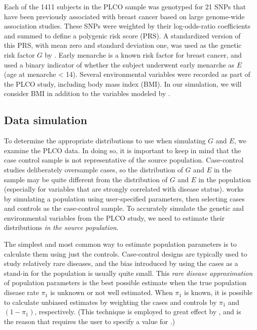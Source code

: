 \documentclass[nojss]{jss}
\begin{document}
Each of the 1411 subjects in the PLCO sample was genotyped for 21 SNPs
that have been previously associated with breast cancer based on large
genome-wide association studies. These SNPs were weighted by their
log-odds-ratio coefficients and summed to define a polygenic risk score
(PRS). A standardized version of this PRS, with mean zero and standard
deviation one, was used as the genetic risk factor \(G\) by
\citeauthor{Wang2018unpublished}. Early menarche is a known risk factor
for breast cancer, and \citeauthor{Wang2018unpublished} used a binary
indicator of whether the subject underwent early menarche as \(E\) (age
at menarche \textless{} 14). Several environmental variables were
recorded as part of the PLCO study, including body mass index (BMI). In
our simulation, we will consider BMI in addition to the variables
modeled by \citeauthor{Wang2018unpublished}.

\subsection{Data simulation}

To determine the appropriate distributions to use when simulating \(G\)
and \(E\), we examine the PLCO data. In doing so, it is important to
keep in mind that the case control sample is not representative of the
source population. Case-control studies deliberately oversample cases,
so the distribution of \(G\) and \(E\) in the sample may be quite
different from the distribution of \(G\) and \(E\) in the population
(especially for variables that are strongly correlated with disease
status).  works by simulating a population using
user-specified parameters, then selecting  cases and
 controls as the case-control sample. To accurately
simulate the genetic and environmental variables from the PLCO study, we
need to estimate their distributions \emph{in the source population}.

The simplest and most common way to estimate population parameters is to
calculate them using just the controls. Case-control designs are
typically used to study relatively rare diseases, and the bias
introduced by using the cases as a stand-in for the population is
usually quite small. This \emph{rare disease approximation} of
population parameters is the best possible estimate when the true
population disease rate \(\pi_1\) is unknown or not well estimated. When
\(\pi_1\) is known, it is possible to calculate unbiased estimates by
weighting the cases and controls by \(\pi_1\) and \((1 - \pi_1)\),
respectively. (This technique is employed to great effect by
\citeauthor{Stalder2017}, and is the reason that  requires
the user to specify a value for .)
\end{document}
